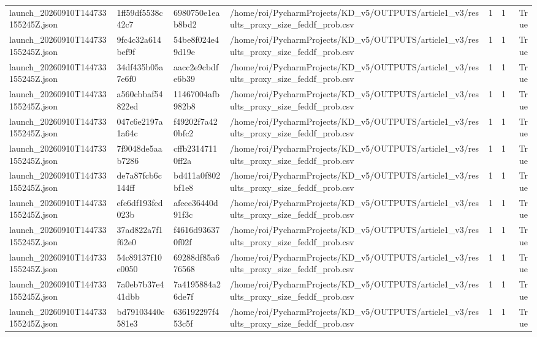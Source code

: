 \begin{tabular}{llllrrr}
launch\_20260910T144733155245Z.json & 1ff59df5538c42c7 & 6980750e1eab8bd2 & /home/roi/PycharmProjects/KD\_v5/OUTPUTS/article1\_v3/results\_proxy\_size\_feddf\_prob.csv & 1 & 1 & True \\
launch\_20260910T144733155245Z.json & 9fc4c32a614bef9f & 54be8f024e49d19e & /home/roi/PycharmProjects/KD\_v5/OUTPUTS/article1\_v3/results\_proxy\_size\_feddf\_prob.csv & 1 & 1 & True \\
launch\_20260910T144733155245Z.json & 34df435b05a7e6f0 & aacc2e9cbdfe6b39 & /home/roi/PycharmProjects/KD\_v5/OUTPUTS/article1\_v3/results\_proxy\_size\_feddf\_prob.csv & 1 & 1 & True \\
launch\_20260910T144733155245Z.json & a560cbbaf54822ed & 11467004afb982b8 & /home/roi/PycharmProjects/KD\_v5/OUTPUTS/article1\_v3/results\_proxy\_size\_feddf\_prob.csv & 1 & 1 & True \\
launch\_20260910T144733155245Z.json & 047c6e2197a1a64c & f49202f7a420bfc2 & /home/roi/PycharmProjects/KD\_v5/OUTPUTS/article1\_v3/results\_proxy\_size\_feddf\_prob.csv & 1 & 1 & True \\
launch\_20260910T144733155245Z.json & 7f9048de5aab7286 & cffb23147110ff2a & /home/roi/PycharmProjects/KD\_v5/OUTPUTS/article1\_v3/results\_proxy\_size\_feddf\_prob.csv & 1 & 1 & True \\
launch\_20260910T144733155245Z.json & de7a87fcb6c144ff & bd411a0f802bf1e8 & /home/roi/PycharmProjects/KD\_v5/OUTPUTS/article1\_v3/results\_proxy\_size\_feddf\_prob.csv & 1 & 1 & True \\
launch\_20260910T144733155245Z.json & efe6df193fed023b & afeee36440d91f3c & /home/roi/PycharmProjects/KD\_v5/OUTPUTS/article1\_v3/results\_proxy\_size\_feddf\_prob.csv & 1 & 1 & True \\
launch\_20260910T144733155245Z.json & 37ad822a7f1f62e0 & f4616d936370f02f & /home/roi/PycharmProjects/KD\_v5/OUTPUTS/article1\_v3/results\_proxy\_size\_feddf\_prob.csv & 1 & 1 & True \\
launch\_20260910T144733155245Z.json & 54c89137f10e0050 & 69288df85a676568 & /home/roi/PycharmProjects/KD\_v5/OUTPUTS/article1\_v3/results\_proxy\_size\_feddf\_prob.csv & 1 & 1 & True \\
launch\_20260910T144733155245Z.json & 7a0eb7b37e441dbb & 7a4195884a26de7f & /home/roi/PycharmProjects/KD\_v5/OUTPUTS/article1\_v3/results\_proxy\_size\_feddf\_prob.csv & 1 & 1 & True \\
launch\_20260910T144733155245Z.json & bd79103440c581e3 & 636192297f453c5f & /home/roi/PycharmProjects/KD\_v5/OUTPUTS/article1\_v3/results\_proxy\_size\_feddf\_prob.csv & 1 & 1 & True \\

\end{tabular}
